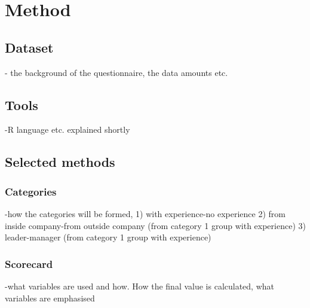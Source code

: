 \section{Method}
\label{Method}

\subsection{Dataset}
\label{Dataset}
- the background of the questionnaire, the data amounts etc. 

\subsection{Tools}
\label{Tools}
-R language etc. explained shortly

\subsection{Selected methods}
\label{Selected methods}

\subsubsection{Categories}
\label{Categories}
-how the categories will be formed, 1) with experience-no experience 2) from
inside company-from outside company (from category 1 group with experience) 3)
leader-manager (from category 1 group with experience) 

\subsubsection{Scorecard}
\label{Scorecard}
-what variables are used and how. How the final value is calculated, what
variables are emphasised
